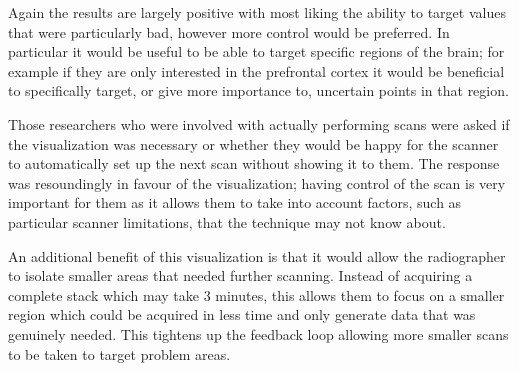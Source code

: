 Again the results are largely positive with most liking the ability to target values that were particularly bad, however more control would be preferred. In particular it would be useful to be able to target specific regions of the brain; for example if they are only interested in the prefrontal cortex it would be beneficial to specifically target, or give more importance to, uncertain points in that region.

Those researchers who were involved with actually performing scans were asked if the visualization was necessary or whether they would be happy for the scanner to automatically set up the next scan without showing it to them. The response was resoundingly in favour of the visualization; having control of the scan is very important for them as it allows them to take into account factors, such as particular scanner limitations, that the technique may not know about.

An additional benefit of this visualization is that it would allow the radiographer to isolate smaller areas that needed further scanning. Instead of acquiring a complete stack which may take 3 minutes, this allows them to focus on a smaller region which could be acquired in less time and only generate data that was genuinely needed. This tightens up the feedback loop allowing more smaller scans to be taken to target problem areas.